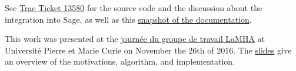See \href{http://trac.sagemath.org/ticket/13580}{Trac Ticket 13580} for
the source code and the discussion about the integration into Sage, as
well as this
\href{https://github.com/OpenDreamKit/OpenDreamKit/blob/master/WP5/T5.6/documentation.pdf}{snapshot
of the documentation}.

This work was presented at the
\href{http://tesson.julien.free.fr/LaMHA/2015/automne.php}{journée du
groupe de travail LaMHA} at Université Pierre et Marie Curie on November
the 26th of 2016. The
\href{https://github.com/OpenDreamKit/OpenDreamKit/raw/master/WP5/T5.6/HPC-Combi.pdf}{slides}
give an overview of the motivations, algorithm, and implementation.
